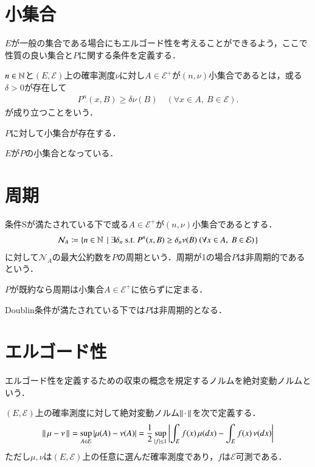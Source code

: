 \section{小集合}
	$E$が一般の集合である場合にもエルゴード性を考えることができるよう，ここで性質の良い集合と$P$に関する条件を定義する．
	
	\begin{dfn}[小集合]
		$n \in \mathbb{N}$と$(E,\mathcal{E})$上の確率測度$\nu$に対し$A \in \mathcal{E}^+$が$(n,\nu)$小集合であるとは，或る$\delta > 0$が存在して
		\begin{align}
			P^n(x,B) \geq \delta \nu(B) \quad (\forall x \in A,\ B \in \mathcal{E}).
		\end{align}
		が成り立つことをいう．
	\end{dfn}
	
	\begin{dfn}[条件S]
		$P$に対して小集合が存在する．
	\end{dfn}
	
	\begin{dfn}[Doublin条件]
		$E$が$P$の小集合となっている．
	\end{dfn}
	
\section{周期}
	\begin{dfn}[周期]
		条件Sが満たされている下で或る$A \in \mathcal{E}^+$が$(n,\nu)$小集合であるとする．
		\begin{align}
			\mathcal{N}_A \coloneqq \left\{ n \in \mathbb{N}\ \left|\ \exists \delta_n\ \mathrm{s.t.}\ P^n(x,B) \geq \delta_n \nu(B)\ (\forall x \in A,\ B \in \mathcal{E}) \right.\right\}
		\end{align}
		に対して$\mathcal{N}_A$の最大公約数を$P$の周期という．周期が1の場合$P$は非周期的であるという．
	\end{dfn}
	
	\begin{prp}[周期の一意性]
		$P$が既約なら周期は小集合$A \in \mathcal{E}^+$に依らずに定まる．
	\end{prp}
	
	\begin{prp}
		Doublin条件が満たされている下では$P$は非周期的となる．
	\end{prp}
	
\section{エルゴード性}
	エルゴード性を定義するための収束の概念を規定するノルムを絶対変動ノルムという．
	\begin{dfn}[絶対変動ノルム]
		$(E,\mathcal{E})$上の確率測度に対して絶対変動ノルム$\left\|\, \cdot\, \right\|_{}$を次で定義する．
		\begin{align}
			\left\|\, \mu - \nu\, \right\|_{} = \operatorname*{sup}_{A \in \mathcal{E}} |\mu(A) - \nu(A)| = \frac{1}{2} \operatorname*{sup}_{|f| \leq 1} \left|\int_E f(x)\, \mu(dx) - \int_E f(x)\, \nu(dx)\right|
		\end{align}
		ただし$\mu,\nu$は$(E,\mathcal{E})$上の任意に選んだ確率測度であり，$f$は$\mathcal{E}$可測である．
	\end{dfn}
	
